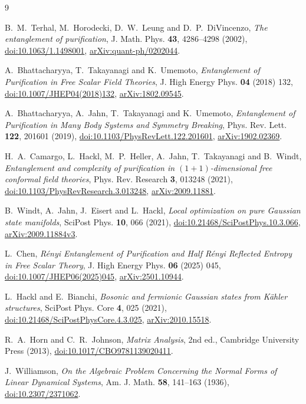 \documentclass[11pt,a4paper]{article}
\numberwithin{equation}{section}
\theoremstyle{remark}
\begin{document}
\begin{thebibliography}{9}
\raggedright
{}
B.~M.~Terhal, M.~Horodecki, D.~W.~Leung and D.~P.~DiVincenzo,
\emph{The entanglement of purification},
J. Math. Phys. \textbf{43}, 4286--4298 (2002),
\href{https://doi.org/10.1063/1.1498001}{doi:10.1063/1.1498001},
\href{https://arxiv.org/abs/quant-ph/0202044}{arXiv:quant-ph/0202044}.

A.~Bhattacharyya, T.~Takayanagi and K.~Umemoto,
\emph{Entanglement of Purification in Free Scalar Field Theories},
J. High Energy Phys. \textbf{04} (2018) 132,
\href{https://doi.org/10.1007/JHEP04(2018)132}{doi:10.1007/JHEP04(2018)132},
\href{https://arxiv.org/abs/1802.09545}{arXiv:1802.09545}.

A.~Bhattacharyya, A.~Jahn, T.~Takayanagi and K.~Umemoto,
\emph{Entanglement of Purification in Many Body Systems and Symmetry Breaking},
Phys. Rev. Lett. \textbf{122}, 201601 (2019),
\href{https://doi.org/10.1103/PhysRevLett.122.201601}{doi:10.1103/PhysRevLett.122.201601},
\href{https://arxiv.org/abs/1902.02369}{arXiv:1902.02369}.

H.~A.~Camargo, L.~Hackl, M.~P.~Heller, A.~Jahn, T.~Takayanagi and B.~Windt,
\emph{Entanglement and complexity of purification in $(1+1)$-dimensional free conformal field theories},
Phys. Rev. Research \textbf{3}, 013248 (2021),
\href{https://doi.org/10.1103/PhysRevResearch.3.013248}{doi:10.1103/PhysRevResearch.3.013248},
\href{https://arxiv.org/abs/2009.11881}{arXiv:2009.11881}.

B.~Windt, A.~Jahn, J.~Eisert and L.~Hackl,
\emph{Local optimization on pure Gaussian state manifolds},
SciPost Phys. \textbf{10}, 066 (2021),
\href{https://doi.org/10.21468/SciPostPhys.10.3.066}{doi:10.21468/SciPostPhys.10.3.066},
\href{https://arxiv.org/abs/2009.11884v3}{arXiv:2009.11884v3}.

L.~Chen,
\emph{R\'enyi Entanglement of Purification and Half R\'enyi Reflected Entropy in Free Scalar Theory},
J. High Energy Phys. \textbf{06} (2025) 045,
\href{https://doi.org/10.1007/JHEP06(2025)045}{doi:10.1007/JHEP06(2025)045},
\href{https://arxiv.org/abs/2501.10944}{arXiv:2501.10944}.

L.~Hackl and E.~Bianchi,
\emph{Bosonic and fermionic Gaussian states from K\"ahler structures},
SciPost Phys. Core \textbf{4}, 025 (2021),
\href{https://doi.org/10.21468/SciPostPhysCore.4.3.025}{doi:10.21468/SciPostPhysCore.4.3.025},
\href{https://arxiv.org/abs/2010.15518}{arXiv:2010.15518}.

R.~A.~Horn and C.~R.~Johnson,
\emph{Matrix Analysis}, 2nd ed., Cambridge University Press (2013),
\href{https://doi.org/10.1017/CBO9781139020411}{doi:10.1017/CBO9781139020411}.

J.~Williamson,
\emph{On the Algebraic Problem Concerning the Normal Forms of Linear Dynamical Systems},
Am. J. Math. \textbf{58}, 141--163 (1936),
\href{https://doi.org/10.2307/2371062}{doi:10.2307/2371062}.
\end{thebibliography}
\end{document}
